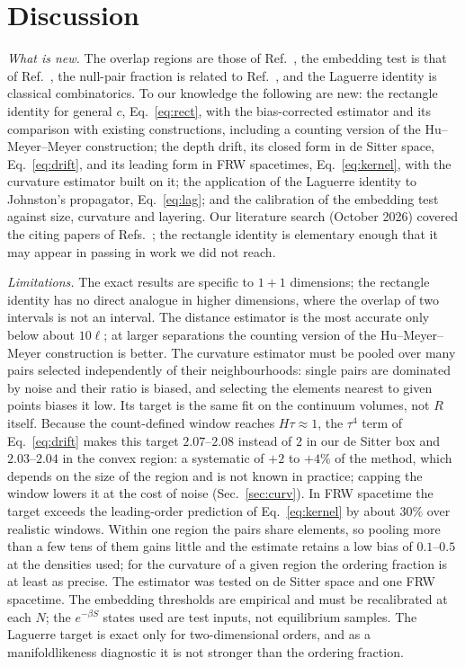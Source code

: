 \documentclass[prd,twocolumn,superscriptaddress,nofootinbib,amsmath,amssymb,floatfix]{revtex4-2}
\begin{document}
\section{Discussion}\label{sec:disc}
\emph{What is new.} The overlap regions are those of Ref.~\cite{BK24}, the embedding test is that of Ref.~\cite{CloughEvans16}, the null-pair fraction is related to Ref.~\cite{GlaserSurya13}, and the Laguerre identity is classical combinatorics. To our knowledge the following are new: the rectangle identity for general $c$, Eq.~\eqref{eq:rect}, with the bias-corrected estimator and its comparison with existing constructions, including a counting version of the Hu--Meyer--Meyer construction; the depth drift, its closed form in de Sitter space, Eq.~\eqref{eq:drift}, and its leading form in FRW spacetimes, Eq.~\eqref{eq:kernel}, with the curvature estimator built on it; the application of the Laguerre identity to Johnston's propagator, Eq.~\eqref{eq:lag}; and the calibration of the embedding test against size, curvature and layering. Our literature search (October 2026) covered the citing papers of Refs.~\cite{BK24,CloughEvans16,Johnston08,Johnston09}; the rectangle identity is elementary enough that it may appear in passing in work we did not reach.

\emph{Limitations.} The exact results are specific to $1+1$ dimensions; the rectangle identity has no direct analogue in higher dimensions, where the overlap of two intervals is not an interval. The distance estimator is the most accurate only below about $10\ell$; at larger separations the counting version of the Hu--Meyer--Meyer construction is better. The curvature estimator must be pooled over many pairs selected independently of their neighbourhoods: single pairs are dominated by noise and their ratio is biased, and selecting the elements nearest to given points biases it low. Its target is the same fit on the continuum volumes, not $R$ itself. Because the count-defined window reaches $H\tau\approx1$, the $\tau^4$ term of Eq.~\eqref{eq:drift} makes this target $2.07$--$2.08$ instead of $2$ in our de Sitter box and $2.03$--$2.04$ in the convex region: a systematic of $+2$ to $+4\%$ of the method, which depends on the size of the region and is not known in practice; capping the window lowers it at the cost of noise (Sec.~\ref{sec:curv}). In FRW spacetime the target exceeds the leading-order prediction of Eq.~\eqref{eq:kernel} by about $30\%$ over realistic windows. Within one region the pairs share elements, so pooling more than a few tens of them gains little and the estimate retains a low bias of $0.1$--$0.5$ at the densities used; for the curvature of a given region the ordering fraction is at least as precise. The estimator was tested on de Sitter space and one FRW spacetime. The embedding thresholds are empirical and must be recalibrated at each $N$; the $e^{-\beta S}$ states used are test inputs, not equilibrium samples. The Laguerre target is exact only for two-dimensional orders, and as a manifoldlikeness diagnostic it is not stronger than the ordering fraction.
\end{document}
